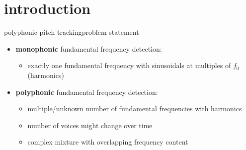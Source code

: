     \section[intro]{introduction}
        \begin{frame}{polyphonic pitch tracking}{problem statement}
            \begin{itemize}
                \item \textbf{monophonic} fundamental frequency detection:
                    \begin{itemize}
                        \item   exactly one fundamental frequency with sinusoidals at multiples of $f_0$ (harmonics)
                    \end{itemize}
                \bigskip
                \item   \textbf{polyphonic} fundamental frequency detection:
                    \begin{itemize}
                        \item   multiple/unknown number of fundamental frequencies with harmonics
                        \item   number of voices might change over time
                        \item   complex mixture with overlapping frequency content
                    \end{itemize}
            \end{itemize}
        \end{frame}
        
